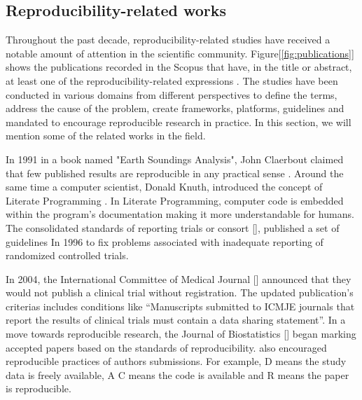 \subsection{Reproducibility-related works}
Throughout the past decade, reproducibility-related studies have received a notable amount of attention in the 
scientific community. Figure[\ref{fig:publications}] shows the publications recorded in the Scopus that have, in the title or abstract, 
at least one of the reproducibility-related expressions \cite{goodman_what_2016}. The studies have been conducted in 
various domains from different perspectives to define the terms, address the cause of the problem, create frameworks, 
platforms, guidelines and mandated to encourage reproducible research in practice. In this section, we will mention 
some of the related works in the field.

In 1991 in a book named "Earth Soundings Analysis", John Claerbout claimed that few published results are reproducible 
in any practical sense \cite{claerbout_earth_1992}. Around the same time a computer scientist, Donald Knuth, introduced 
the concept of Literate Programming \cite{knuth_literate_1984}. In Literate Programming, computer code is embedded within 
the program's documentation making it more understandable for humans. The consolidated standards of reporting trials 
or consort [], published a set of guidelines In 1996 to fix problems associated 
with inadequate reporting of randomized controlled trials.

In 2004, the International Committee of Medical Journal [] announced that they would not publish a 
clinical trial without registration. The updated publication's criterias includes conditions like 
“Manuscripts submitted to ICMJE journals that report the results of clinical trials must contain a data sharing statement”. 
In a move towards reproducible research, the Journal of Biostatistics [] began 
marking accepted papers based on the standards of reproducibility. also encouraged reproducible practices of authors 
submissions. For example, D means the study data is freely available, A C means the code is available and R means the 
paper is reproducible. 

